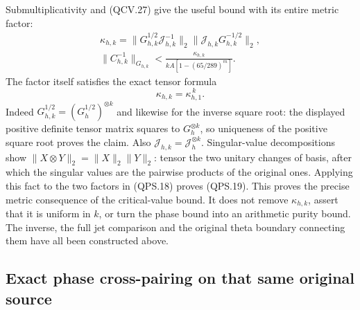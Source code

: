 Submultiplicativity and (QCV.27) give the useful bound with its
entire metric factor:
\[
 \begin{gathered}
 \kappa_{h,k}
  =\|G_{h,k}^{1/2}\mathcal J_{h,k}^{-1}\|_2
       \|\mathcal J_{h,k}G_{h,k}^{-1/2}\|_2,\\
 \|C_{h,k}^{-1}\|_{G_{h,k}}
 <\frac{\kappa_{h,k}}
 {kA[1-(65/289)^m]}.
 \end{gathered}
 \tag{QPS.18}
\]
The factor itself satisfies the exact tensor formula
\[
 \kappa_{h,k}=\kappa_{h,1}^{\,k}.
 \tag{QPS.19}
\]
Indeed \(G_{h,k}^{1/2}=(G_h^{1/2})^{\otimes k}\) and likewise for
the inverse square root: the displayed positive definite tensor
matrix squares to \(G_h^{\otimes k}\), so uniqueness of the
positive square root proves the claim. Also
\(\mathcal J_{h,k}=\mathcal J_h^{\otimes k}\). Singular-value
decompositions show \(\|X\otimes Y\|_2=\|X\|_2\|Y\|_2\):
tensor the two unitary changes of basis, after which the singular
values are the pairwise products of the original ones. Applying
this fact to the two factors in (QPS.18) proves (QPS.19).
This proves the precise metric consequence of the critical-value
bound. It does not remove \(\kappa_{h,k}\), assert that it is
uniform in \(k\), or turn the phase bound into an arithmetic
purity bound. The inverse, the full jet comparison and the original
theta boundary connecting them have all been constructed above.

\subsection{Exact phase cross-pairing on that same original source}

